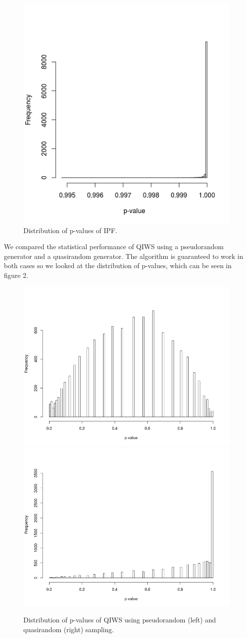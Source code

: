 \documentclass[]{article}
\begin{document}
\begin{figure}[H]

{\centering \includegraphics[width=0.5\linewidth]{figures/ipf_pvalue_dist} 

}

\caption{Distribution of p-values of IPF.}\label{fig:unnamed-chunk-3}
\end{figure}

We compared the statistical performance of QIWS using a pseudorandom
generator and a quasirandom generator. The algorithm is guaranteed to
work in both cases so we looked at the distribution of p-values, which
can be seen in figure 2.

\begin{figure}[H]
\includegraphics[width=0.5\linewidth]{figures/iqws_prng_pvalue_dist} \includegraphics[width=0.5\linewidth]{figures/iqws_pvalue_dist} \caption{Distribution of p-values of QIWS using pseudorandom (left) and quasirandom (right) sampling.}\label{fig:unnamed-chunk-4}
\end{figure}
\end{document}
